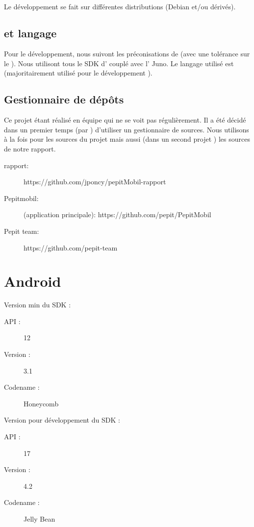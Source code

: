 \subsection{\os{}}
Le développement se fait sur différentes distributions \linux{} (Debian et/ou dérivés).
\subsection{\ide{} et langage}
Pour le développement, nous suivont les préconisations de \google{} (avec une tolérance sur le \os{}). Nous utilisont tous le SDK d'\android{} couplé avec l'\ide{} \eclipse{} Juno. Le langage utilisé est \java{} (majoritairement utilisé pour le développement \android{}).
\subsection{Gestionnaire de dépôts}
Ce projet étant réalisé en équipe qui ne se voit pas régulièrement. Il a été décidé dans un premier temps (par \responsableProjet{}) d'utiliser un gestionnaire de sources. Nous utilisons \github{} à la fois pour les sources du projet mais aussi (dans un second projet \github{}) les sources de notre rapport.
\begin{description}
    \item[rapport:] https://github.com/jponcy/pepitMobil-rapport
    \item[Pepitmobil:] (application principale): https://github.com/pepit/PepitMobil
    \item[Pepit team:] https://github.com/pepit-team
\end{description}
\section{Android}
Version min du SDK :
\begin{description}
\item[API : ] 12
\item[Version : ] 3.1 
\item[Codename : ] Honeycomb 
\end{description}

Version pour développement du SDK :
\begin{description}
\item[API : ] 17
\item[Version : ] 4.2 
\item[Codename : ] Jelly Bean
\end{description}

